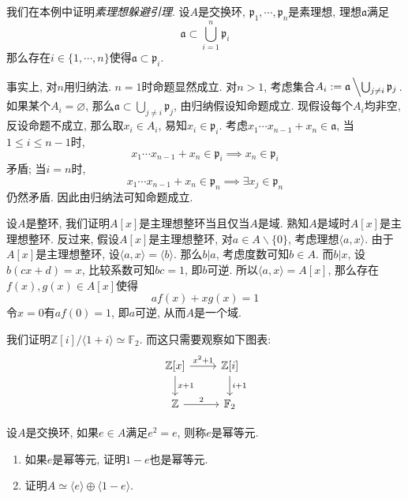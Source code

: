 \begin{eg}
    我们在本例中证明\textit{素理想躲避引理}.
    设$A$是交换环, $\mathfrak{p}_1,\cdots,\mathfrak{p}_n$是素理想, 理想$\mathfrak{a}$满足
    \[\mathfrak{a}\subset\bigcup_{i=1}^n\mathfrak{p}_i\]
    那么存在$i\in\{1,\cdots,n\}$使得$\mathfrak{a}\subset\mathfrak{p}_i$.

    事实上, 对$n$用归纳法.
    $n=1$时命题显然成立.
    对$n>1$, 考虑集合$A_i:=\mathfrak{a}\left\backslash\bigcup_{j\neq i}\mathfrak{p}_j\right.$.
    如果某个$A_i=\varnothing$, 那么$\mathfrak{a}\subset\bigcup_{j\neq i}\mathfrak{p}_j$, 由归纳假设知命题成立.
    现假设每个$A_i$均非空, 反设命题不成立, 那么取$x_i\in A_i$, 易知$x_i\in\mathfrak{p}_i$.
    考虑$x_1\cdots x_{n-1}+x_n\in\mathfrak{a}$, 当$1\leq i\leq n-1$时,
    \[x_1\cdots x_{n-1}+x_n\in\mathfrak{p}_i\implies x_n\in\mathfrak{p}_i\]
    矛盾; 当$i=n$时,
    \[x_1\cdots x_{n-1}+x_n\in\mathfrak{p}_n\implies\exists x_j\in\mathfrak{p}_n\]
    仍然矛盾.
    因此由归纳法可知命题成立.
\end{eg}

\begin{eg}
    设$A$是整环, 我们证明$A[x]$是主理想整环当且仅当$A$是域.
    熟知$A$是域时$A[x]$是主理想整环.
    反过来, 假设$A[x]$是主理想整环, 对$a\in A\backslash\{0\}$, 考虑理想$\langle a,x\rangle$.
    由于$A[x]$是主理想整环, 设$\langle a,x\rangle=\langle b\rangle$.
    那么$b|a$, 考虑度数可知$b\in A$.
    而$b|x$, 设$b(cx+d)=x$, 比较系数可知$bc=1$, 即$b$可逆.
    所以$\langle a,x\rangle=A[x]$, 那么存在$f(x),g(x)\in A[x]$使得
    \[af(x)+xg(x)=1\]
    令$x=0$有$af(0)=1$, 即$a$可逆, 从而$A$是一个域.
\end{eg}

\begin{eg}
    我们证明$\mathbb{Z}[i]/\langle 1+i\rangle\simeq\mathbb{F}_2$.
    而这只需要观察如下图表:
    \[\begin{tikzcd}
        \mathbb{Z}[x]\ar[r, "x^2+1"]\ar[d, "x+1"] & \mathbb{Z}[i]\ar[d, "i+1"]\\
        \mathbb{Z}\ar[r, "2"] & \mathbb{F}_2
    \end{tikzcd}\]
\end{eg}

\begin{ex}
    设$A$是交换环, 如果$e\in A$满足$e^2=e$, 则称$e$是幂等元.
    \begin{enumerate}[(1)]
        \item 如果$e$是幂等元, 证明$1-e$也是幂等元.
        \item 证明$A\simeq\langle e\rangle\oplus\langle 1-e\rangle$.
    \end{enumerate}
\end{ex}

